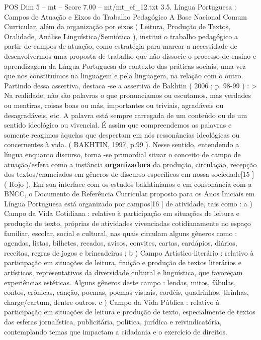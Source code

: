 \begin{textsample}{POS Dim 5 – mt – Score 7.00 – mt/mt\_ef\_12.txt}  \label{ex:f5_pos_090}
3.5.
Língua Portuguesa : Campos de Atuação e Eixos do Trabalho Pedagógico A Base Nacional Comum Curricular, além da organização por eixos ( Leitura, Produção de Textos, Oralidade, Análise Linguística/Semiótica ), institui o trabalho pedagógico a partir de campos de atuação, como estratégia para marcar a necessidade de desenvolvermos uma proposta de trabalho que não dissocie o processo de ensino e aprendizagem da Língua Portuguesa do contexto das práticas sociais, uma vez que nos constituímos na linguagem e pela linguagem, na relação com o outro.
Partindo dessa assertiva, destaca -se a assertiva de Bakhtin ( 2006 ; p. 98-99 ) : > Na realidade, não são palavras o que pronunciamos ou escutamos, mas verdades ou mentiras, coisas boas ou más, importantes ou triviais, agradáveis ou desagradáveis, etc.
A palavra está sempre carregada de um conteúdo ou de um sentido ideológico ou vivencial.
É assim que compreendemos as palavras e somente reagimos àquelas que despertam em nós ressonâncias ideológicas ou concernentes à vida. ( BAKHTIN, 1997, p.99 ).
Nesse sentido, entendendo a língua enquanto discurso, torna -se primordial situar o conceito de campo de atuação/esfera como a instância \textbf{organizadora} da produção, circulação, recepção dos textos/enunciados em gêneros de discurso específicos em nossa sociedade[15 ] ( Rojo ).
Em sua interface com os estudos bakhtinianos e em consonância com a BNCC, o Documento de Referência Curricular proposto para os Anos Iniciais em Língua Portuguesa está organizado por campos[16 ] de atividade, tais como : a ) Campo da Vida Cotidiana : relativo à participação em situações de leitura e produção de texto, próprias de atividades vivenciadas cotidianamente no espaço familiar, escolar, social e cultural, nas quais circulam alguns gêneros como : agendas, listas, bilhetes, recados, avisos, convites, cartas, cardápios, diários, receitas, regras de jogos e brincadeiras ; b ) Campo Artístico-literário : relativo à participação em situações de leitura, fruição e produção de textos literários e artísticos, representativos da diversidade cultural e linguística, que favoreçam experiências estéticas.
Alguns gêneros deste campo : lendas, mitos, fábulas, contos, crônicas, canção, poemas, poemas visuais, cordéis, quadrinhos, tirinhas, charge/cartum, dentre outros. c ) Campo da Vida Pública : relativo à participação em situações de leitura e produção de texto, especialmente de textos das esferas jornalística, publicitária, política, jurídica e reivindicatória, contemplando temas que impactam a cidadania e o exercício de direitos.

\end{textsample}
